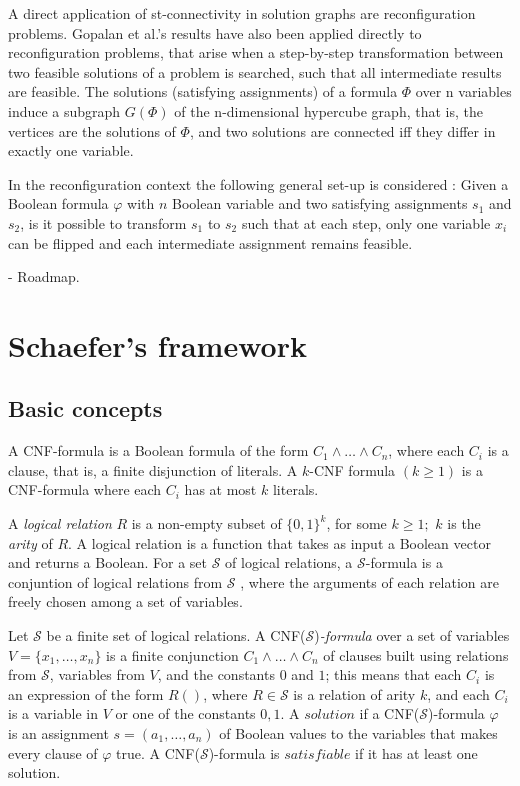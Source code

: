 A direct application of st-connectivity in solution graphs are reconfiguration problems. Gopalan et al.’s results have also been applied
directly to reconfiguration problems, that arise when a step-by-step transformation
between two feasible solutions of a problem is searched, such that all intermediate results are feasible. The solutions
(satisfying assignments) of a formula $\Phi$ over n variables induce  a subgraph $G(\Phi)$ of the n-dimensional hypercube graph, that is, the
vertices are the solutions of $\Phi$, and two solutions are connected iff they differ in exactly one variable.

In the reconfiguration context the following general set-up is considered :
Given a Boolean formula $\varphi$ with $n$ Boolean variable and two satisfying assignments $s_{1}$ and $s_{2}$, is it possible to
transform $s_{1}$ to $s_{2}$ such that at each step, only one variable $x_i$ can be flipped and each intermediate assignment remains
feasible. 


- Roadmap.


\section{Schaefer's framework}

\subsection{Basic concepts}
A CNF-formula is a Boolean formula of the form $C_{1} \land \dots \land C_{n}$, where each $C_i$ is a clause, that is, a finite disjunction
of literals. A $k$-CNF formula $(k \geq 1)$ is a CNF-formula where each $C_i$ has at most $k$ literals.

A \textit{logical relation} $R$ is a non-empty subset of $\{0,1\}^k$, for some $k \geq 1;$ $k$ is the \textit{arity} of $R$. A logical relation
is a function that takes as input a Boolean vector and returns a Boolean. For a set $\mathcal{S}$ of logical relations, a $\mathcal{S}$-formula
is a conjuntion of logical relations from $\mathcal{S}$ , where the arguments of each relation are freely chosen among a set of variables.



Let $\mathcal{S}$ be a finite set of logical relations. A CNF($\mathcal{S}$)\textit{-formula} over a set of variables $V = \{x_{1}, \dots, x_{n}\}$
is a finite conjunction $C_{1} \land \dots \land C_{n}$ of clauses built using relations from $\mathcal{S}$, variables from $V$, and the constants $0$ and $1$;
this means that each $C_{i}$ is an expression of the form $R()$, where $R \in \mathcal{S}$ is a relation of arity $k$, and each $C_{i}$ is a
variable in $V$ or one of the constants $0,1$. A $\textit{solution}$ if a CNF($\mathcal{S}$)-formula $\varphi$ is an assignment
$s = (a_{1}, \dots, a_{n})$ of Boolean values to the variables that makes every clause of $\varphi$ true. A CNF($\mathcal{S}$)-formula is
$\textit{satisfiable}$ if it has at least one solution.

